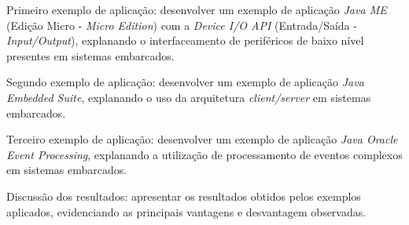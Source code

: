 Primeiro exemplo de aplicação: desenvolver um exemplo de aplicação \textit{Java ME} (Edição Micro - \textit{Micro Edition}) com a \textit{Device I/O API} (Entrada/Saída - \textit{Input/Output}), explanando o interfaceamento de periféricos de baixo nível presentes em sistemas embarcados.

Segundo exemplo de aplicação: desenvolver um exemplo de aplicação \textit{Java Embedded Suite}, explanando o uso da arquitetura \textit{client/server} em sistemas embarcados.

Terceiro exemplo de aplicação: desenvolver um exemplo de aplicação \textit{Java Oracle Event Processing}, explanando a utilização de processamento de eventos complexos em sistemas embarcados.

Discussão dos resultados: apresentar os resultados obtidos pelos exemplos 
aplicados, evidenciando as principais vantagens e desvantagem observadas.
